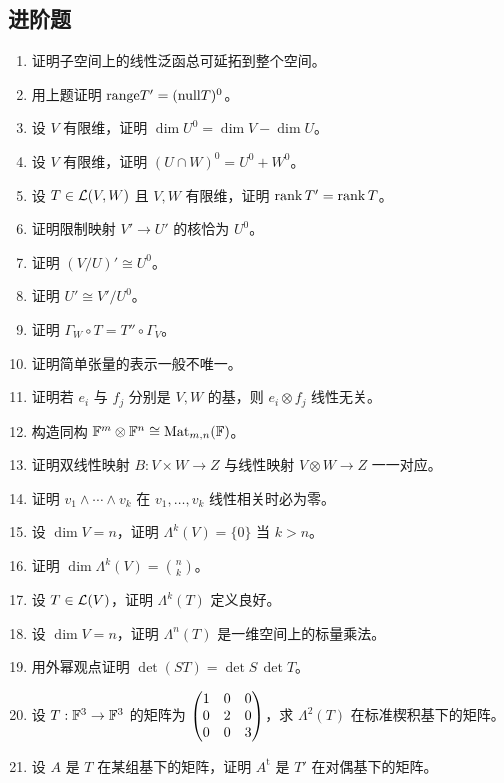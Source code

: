 \subsection*{进阶题}




\begin{enumerate}[resume, label=\textbf{\arabic*.}, leftmargin=*, itemsep=0.5em] \item \medium 证明子空间上的线性泛函总可延拓到整个空间。 \item \medium 用上题证明 $\mathrm{range} T'=(\mathrm{null} T)^0$。 \item \medium 设 $V$ 有限维，证明 $\dim U^0=\dim V-\dim U$。 \item \medium 设 $V$ 有限维，证明 $(U\cap W)^0=U^0+W^0$。 \item \medium 设 $T\in\mathcal{L}(V,W)$ 且 $V,W$ 有限维，证明 $\operatorname{rank} T'=\operatorname{rank} T$。 \item \medium 证明限制映射 $V'\to U'$ 的核恰为 $U^0$。 \item \medium 证明 $(V/U)'\cong U^0$。 \item \medium 证明 $U'\cong V'/U^0$。 \item \medium 证明 $\Gamma_W\circ T=T''\circ\Gamma_V$。 \item \medium 证明简单张量的表示一般不唯一。 \item \medium 证明若 $e_i$ 与 $f_j$ 分别是 $V,W$ 的基，则 $e_i\otimes f_j$ 线性无关。 \item \medium 构造同构 $\mathbb{F}^m\otimes\mathbb{F}^n\cong \mathrm{Mat}_{m,n}(\mathbb{F})$。 \item \medium 证明双线性映射 $B:V\times W\to Z$ 与线性映射 $V\otimes W\to Z$ 一一对应。 \item \medium 证明 $v_1\wedge\cdots\wedge v_k$ 在 $v_1,\dots,v_k$ 线性相关时必为零。 \item \medium 设 $\dim V=n$，证明 $\Lambda^k(V)=\{0\}$ 当 $k>n$。 \item \medium 证明 $\dim\Lambda^k(V)=\binom{n}{k}$。 \item \medium 设 $T\in\mathcal{L}(V)$，证明 $\Lambda^k(T)$ 定义良好。 \item \medium 设 $\dim V=n$，证明 $\Lambda^n(T)$ 是一维空间上的标量乘法。 \item \medium 用外幂观点证明 $\det(ST)=\det S\,\det T$。 \item \medium 设 $T:\mathbb{F}^3\to\mathbb{F}^3$ 的矩阵为 $\begin{pmatrix} 1&0&0\\0&2&0\\0&0&3 \end{pmatrix}$，求 $\Lambda^2(T)$ 在标准楔积基下的矩阵。 \item \medium 设 $A$ 是 $T$ 在某组基下的矩阵，证明 $A^{\mathrm t}$ 是 $T'$ 在对偶基下的矩阵。 \end{enumerate}




